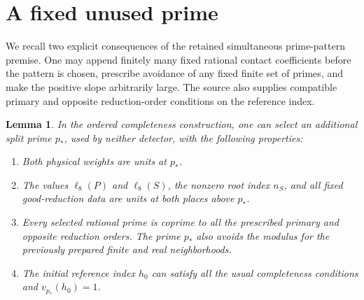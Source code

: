 \documentclass[11pt,a4paper]{article}
\newtheorem{lemma}[theorem]{Lemma}
\begin{document}
\section{A fixed unused prime}

We recall two explicit consequences of the retained simultaneous
prime-pattern premise. One may append finitely many fixed rational
contact coefficients before the pattern is chosen, prescribe avoidance
of any fixed finite set of primes, and make the positive slope
arbitrarily large. The source also supplies compatible primary and
opposite reduction-order conditions on the reference index.

\begin{lemma}\label{lem:dummy}
In the ordered completeness construction, one can select an additional
split prime \(p_*\), used by neither detector, with the following
properties:
\begin{enumerate}
\item Both physical weights are units at \(p_*\).
\item The values \(\ell_8(P)\) and \(\ell_8(S)\), the nonzero
root index \(n_S\), and all fixed good-reduction data are units at
both places above \(p_*\).
\item Every selected rational prime is coprime to all the prescribed
primary and opposite reduction orders. The prime \(p_*\) also avoids
the modulus for the previously prepared finite and real neighborhoods.
\item The initial reference index \(h_0\) can satisfy all the usual
completeness conditions and \(v_{p_*}(h_0)=1\).
\end{enumerate}
\end{lemma}
\end{document}
